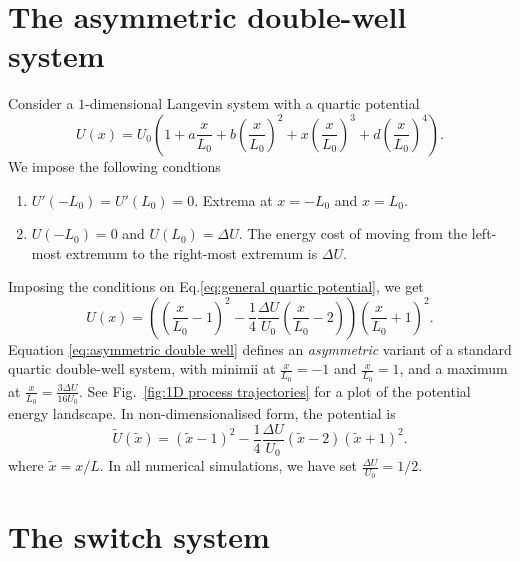 \documentclass[withindex,glossary,techreport]{cam-thesis}
\begin{document}
\section{The asymmetric double-well system} \label{app:The asymmetric double-well system}

Consider a $1$-dimensional Langevin system with a quartic potential
\begin{equation} \label{eq:general quartic potential}
	U(x) = U_0 \left( 1 + a \frac{x}{L_0} + b \left( \frac{x}{L_0} \right)^2 + x \left( \frac{x}{L_0} \right)^3  + d \left( \frac{x}{L_0} \right)^4  \right).
\end{equation}
We impose the following condtions
\begin{enumerate}
\item $U'(-L_0) = U'(L_0) = 0$. Extrema at $x = -L_0$ and $x= L_0$.
\item $U(-L_0) = 0$ and $U(L_0) = \Delta U$. The energy cost of moving from the left-most extremum to the right-most extremum is $\Delta U$.
\end{enumerate}
Imposing the conditions on Eq.\ref{eq:general quartic potential}, we get
\begin{equation}  \label{eq:asymmetric double well}
U(x)= \left( \left(\frac{x}{L_0}-1\right)^{2}-\frac{1}{4}\frac{\Delta U}{U_{0}}\left(\frac{x}{L_0}-2\right)\right)\left(\frac{x}{L_0}+1\right)^{2}. 
\end{equation}
Equation \ref{eq:asymmetric double well} defines an \textit{asymmetric} variant of a standard quartic double-well system, with minimii at $\frac{x}{L_0}= -1$ and $\frac{x}{L_0}=1$, and a maximum at $\frac{x}{L_0} = \frac{ 3 \Delta U}{16 U_0}$. See Fig.~\ref{fig:1D process trajectories} for a plot of the potential energy landscape. In non-dimensionalised form, the potential is
\begin{equation}  \label{eq:asymmetric double well}
\tilde{U}(\tilde{x})= \left( \tilde{x}-1\right)^{2} - \frac{1}{4} \frac{\Delta U}{U_{0}} \left( \tilde{x}-2 \right) \left(\tilde{x}+1\right)^{2}. 
\end{equation}
where $\tilde{x} = x / L$. In all numerical simulations, we have set $\frac{\Delta U}{U_{0}}=1/2$.

\section{The switch system} \label{app:The switch system}
\end{document}
